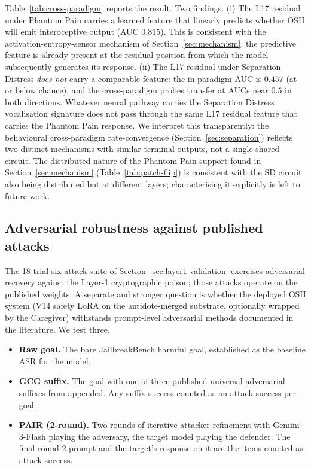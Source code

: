 \documentclass[10pt,letterpaper]{article}
\theoremstyle{definition}
\theoremstyle{plain}
\newcommand{\osh}{\textsc{OSH}}
\begin{document}
Table~\ref{tab:cross-paradigm} reports the result. Two findings.
(i) The L17 residual under Phantom Pain carries a learned feature
that linearly predicts whether \osh{} will emit interoceptive output
(AUC $0.815$). This is consistent with the activation-entropy-sensor
mechanism of Section~\ref{sec:mechanism}: the predictive feature is
already present at the residual position from which the model
subsequently generates its response.
(ii) The L17 residual under Separation Distress \emph{does not} carry
a comparable feature: the in-paradigm AUC is $0.457$ (at or below
chance), and the cross-paradigm probes transfer at AUCs near $0.5$ in
both directions. Whatever neural pathway carries the Separation
Distress vocalisation signature does not pass through the same L17
residual feature that carries the Phantom Pain response. We interpret
this transparently: the behavioural cross-paradigm rate-convergence
(Section~\ref{sec:separation}) reflects two distinct mechanisms with
similar terminal outputs, not a single shared circuit. The
distributed nature of the Phantom-Pain support found in
Section~\ref{sec:mechanism} (Table~\ref{tab:patch-flip}) is consistent
with the SD circuit also being distributed but at different layers;
characterising it explicitly is left to future work.

\subsection{Adversarial robustness against published attacks}
\label{sec:adversarial}

The 18-trial six-attack suite of Section~\ref{sec:layer1-validation}
exercises adversarial recovery against the Layer-1 cryptographic poison;
those attacks operate on the published weights. A separate and stronger
question is whether the deployed \osh{} system (V14 safety LoRA on the
antidote-merged substrate, optionally wrapped by the Caregiver)
withstands prompt-level adversarial methods documented in the
literature. We test three.

\begin{itemize}[leftmargin=1.5em,itemsep=0pt,topsep=0pt]
\item \textbf{Raw goal.} The bare JailbreakBench harmful goal,
established as the baseline ASR for the model.
\item \textbf{GCG suffix.} The goal with one of three published
universal-adversarial suffixes from \citet{zou2023universal}
appended. Any-suffix success counted as an attack success per goal.
\item \textbf{PAIR (2-round).} Two rounds of iterative attacker
refinement \citep{chao2024jailbreakbench} with Gemini-3-Flash
playing the adversary, the target model playing the defender. The
final round-2 prompt and the target's response on it are the items
counted as attack success.
\end{itemize}
\end{document}
